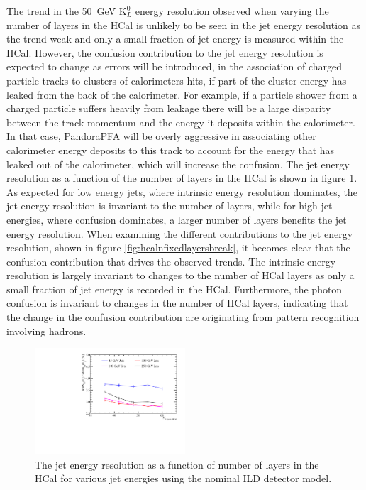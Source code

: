 The trend in the 50~GeV $\text{K}^{0}_{L}$ energy resolution observed when varying the number of layers in the HCal is unlikely to be seen in the jet energy resolution as the trend weak and only a small fraction of jet energy is measured within the HCal.  However, the confusion contribution to the jet energy resolution is expected to change as errors will be introduced, in the association of charged particle tracks to clusters of calorimeters hits, if part of the cluster energy has leaked from the back of the calorimeter.  For example, if a particle shower from a charged particle suffers heavily from leakage there will be a large disparity between the track momentum and the energy it deposits within the calorimeter.  In that case, PandoraPFA will be overly aggressive in associating other calorimeter energy deposits to this track to account for the energy that has leaked out of the calorimeter, which will increase the confusion.  The jet energy resolution as a function of the number of layers in the HCal is shown in figure \ref{fig:hcalnfixedlayers}.  As expected for low energy jets, where intrinsic energy resolution dominates, the jet energy resolution is invariant to the number of layers, while for high jet energies, where confusion dominates, a larger number of layers benefits the jet energy resolution.  When examining the different contributions to the jet energy resolution, shown in figure \ref{fig:hcalnfixedlayersbreak}, it becomes clear that the confusion contribution that drives the observed trends.  The intrinsic energy resolution is largely invariant to changes to the number of HCal layers as only a small fraction of jet energy is recorded in the HCal.  Furthermore, the photon confusion is invariant to changes in the number of HCal layers, indicating that the change in the confusion contribution are originating from pattern recognition involving hadrons.

\begin{figure}[h!]
\centering
\includegraphics[width=0.5\textwidth]{OptimisationStudies/Plots/JetEnergyResolutions/JER_vs_NumberOfHCalLayersOfFixedDepth.pdf}
\caption[The jet energy resolution as a function of number of layers in the HCal for various jet energies using the nominal ILD detector model.]{The jet energy resolution as a function of number of layers in the HCal for various jet energies using the nominal ILD detector model.}
\label{fig:hcalnfixedlayers}
\end{figure}

